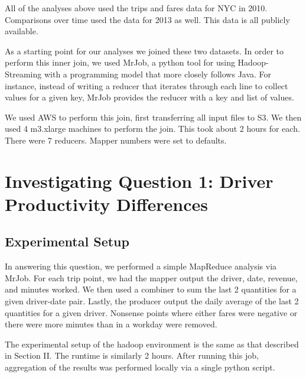 \documentclass[twoside]{article}
\begin{document}
\begin{multicols}{2}
All of the analyses above used the trips and fares data for NYC in 2010. Comparisons over time used the data for 2013 as well. This data is all publicly available. \cite{NYC_DATA}

As a starting point for our analyses we joined these two datasets. In order to perform this inner join, we used MrJob, a python tool for using Hadoop-Streaming with a programming model that more closely follows Java.\cite{MRJOB}  For instance, instead of writing a reducer that iterates through each line to collect values for a given key, MrJob provides the reducer with a key and list of values. 

We used AWS to perform this join, first transferring all input files to S3. We then used 4 m3.xlarge machines to perform the join. This took about 2 hours for each. There were 7 reducers. Mapper numbers were set to defaults. 


\section{Investigating Question 1: Driver Productivity Differences}

\subsection{Experimental Setup}
In answering this question, we performed a simple MapReduce analysis via MrJob. For each trip point, we had the mapper output the driver, date, revenue, and minutes worked. We then used a combiner to sum the last 2 quantities for a given driver-date pair.  Lastly, the producer output the daily average of the last 2 quantities for a given driver. Nonsense points where either fares were negative or there were more minutes than in a workday were removed. 

The experimental setup of the hadoop environment is the same as that described in Section II. The runtime is similarly 2 hours. After running this job, aggregation of the results was performed locally via a single python script.


\end{multicols}
\end{document}
